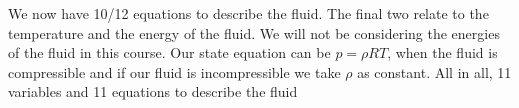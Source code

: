 \documentclass[class=report, crop=false, 12pt,a4paper]{standalone}
\begin{document}
We now have 10/12 equations to describe the fluid. The final two relate to the temperature and the energy of the fluid. We will not be considering the energies of the fluid in this course. Our state equation can be $p = \rho RT$, when the fluid is compressible and if our fluid is incompressible we take $\rho$ as constant. All in all, 11 variables and 11 equations to describe the fluid
\end{document}

